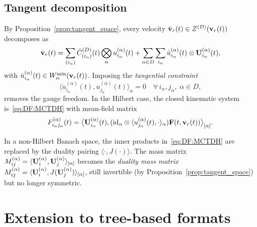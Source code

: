 \subsection*{Tangent decomposition}

By Proposition~\ref{prop:tangent_space}, every velocity
$\dot{\mathbf{v}}_r(t) \in Z^{(D)}(\mathbf{v}_r(t))$ decomposes as
\begin{equation}
\label{eq:DF:tangent_decomp}
    \dot{\mathbf{v}}_r(t)
    = \sum_{(i_\alpha)} \dot{C}^{(D)}_{(i_\alpha)}(t)
      \bigotimes_\alpha u^{(\alpha)}_{i_\alpha}(t)
    + \sum_{\alpha \in D} \sum_{i_\alpha}
      \dot{u}^{(\alpha)}_{i_\alpha}(t) \otimes \mathbf{U}^{(\alpha)}_{i_\alpha}(t),
\end{equation}
with $\dot{u}^{(\alpha)}_{i_\alpha}(t) \in W^{\min}_{\alpha}(\mathbf{v}_r(t))$.
Imposing the \emph{tangential constraint}
\begin{equation}
\label{eq:DF:tangential}
    \langle \dot{u}^{(\alpha)}_{i_\alpha}(t),
    u^{(\alpha)}_{j_\alpha}(t) \rangle_\alpha = 0
    \quad \forall\, i_\alpha, j_\alpha,\;\alpha \in D,
\end{equation}
removes the gauge freedom. In the Hilbert case, the closed kinematic
system is~\eqref{eq:DF:MCTDH} with mean-field matrix
\begin{equation}
\label{eq:DF:mean_field_hilbert}
    F^{(\alpha)}_{i_\alpha j_\alpha}(t)
    = \bigl\langle \mathbf{U}^{(\alpha)}_{i_\alpha}(t),
      (\mathrm{id}_{\alpha} \otimes
      \langle u^{(\alpha)}_{j_\alpha}(t), \cdot\rangle_\alpha)
      \mathbf{F}(t,\mathbf{v}_r(t))
      \bigr\rangle_{[\alpha]}.
\end{equation}

\begin{remark}
\label{rem:kinematic_banach}
In a non-Hilbert Banach space, the inner products in~\eqref{eq:DF:MCTDH}
are replaced by the duality pairing $\langle\cdot, J(\cdot)\rangle$.
The mass matrix $M^{(\alpha)}_{ij} = \langle \mathbf{U}^{(\alpha)}_i,
\mathbf{U}^{(\alpha)}_j\rangle_{[\alpha]}$ becomes the \emph{duality mass matrix}
$M^{(\alpha)}_{ij} = \langle \mathbf{U}^{(\alpha)}_i, J(\mathbf{U}^{(\alpha)}_j)\rangle_{[\alpha]}$,
still invertible (by Proposition~\ref{prop:tangent_space}) but no longer
symmetric.
\end{remark}

\section{Extension to tree-based formats}
\label{sec:DF:treebased}

